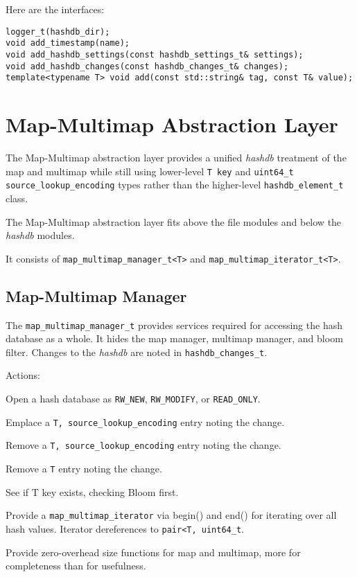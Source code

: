 \documentclass[12pt,twoside]{article}
\newcommand{\hdb}{\emph{hashdb}\xspace}
\begin{document}
Here are the interfaces:

\begin{small}
\begin{verbatim}
logger_t(hashdb_dir);
void add_timestamp(name);
void add_hashdb_settings(const hashdb_settings_t& settings);
void add_hashdb_changes(const hashdb_changes_t& changes);
template<typename T> void add(const std::string& tag, const T& value);
\end{verbatim}
\end{small}

\section{Map-Multimap Abstraction Layer}
\begin{compactitem}
\item The Map-Multimap abstraction layer
provides a unified \hdb treatment of the map and multimap
while still using lower-level \texttt{T key}
and \texttt{uint64\_t source\_lookup\_encoding} types
rather than the higher-level \texttt{hashdb\_element\_t} class.
\item The Map-Multimap abstraction layer fits above the file modules
and below the \hdb modules.
\item It consists of \texttt{map\_multimap\_manager\_t<T>}
and \texttt{map\_multimap\_iterator\_t<T>}.
\end{compactitem}

\subsection{Map-Multimap Manager}
The \texttt{map\_multimap\_manager\_t}
provides services required for accessing the hash database
as a whole.  It hides the map manager, multimap manager, and bloom filter.
Changes to the \hdb are noted in \texttt{hashdb\_changes\_t}.

Actions:
\begin{compactitem}
\item Open a hash database as
\texttt{RW\_NEW}, \texttt{RW\_MODIFY}, or \texttt{READ\_ONLY}.
\item Emplace a \texttt{T, source\_lookup\_encoding} entry noting the change.
\item Remove a \texttt{T, source\_lookup\_encoding} entry noting the change.
\item Remove a \texttt{T} entry noting the change.
\item See if T key exists, checking Bloom first.
\item Provide a \texttt{map\_multimap\_iterator} via begin() and end()
for iterating over all hash values.
Iterator dereferences to \texttt{pair<T, uint64\_t}.
\item Provide zero-overhead size functions for map and multimap,
more for completeness than for usefulness.
\end{compactitem}
\end{document}
